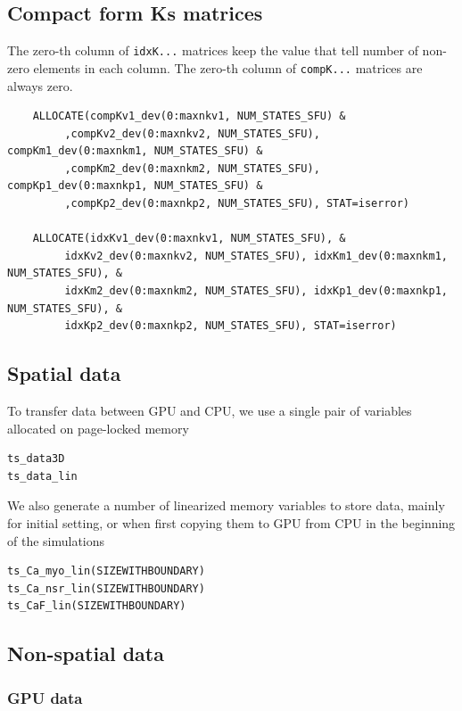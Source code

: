 \subsection{Compact form Ks matrices}
\label{sec:Ks_compact}

The zero-th column of \verb!idxK...! matrices keep the value that tell number of
non-zero elements in each column. The zero-th column of \verb!compK...! matrices
are always zero. 
\begin{verbatim}
    ALLOCATE(compKv1_dev(0:maxnkv1, NUM_STATES_SFU) &
         ,compKv2_dev(0:maxnkv2, NUM_STATES_SFU), compKm1_dev(0:maxnkm1, NUM_STATES_SFU) &
         ,compKm2_dev(0:maxnkm2, NUM_STATES_SFU), compKp1_dev(0:maxnkp1, NUM_STATES_SFU) &
         ,compKp2_dev(0:maxnkp2, NUM_STATES_SFU), STAT=iserror)

    ALLOCATE(idxKv1_dev(0:maxnkv1, NUM_STATES_SFU), &
         idxKv2_dev(0:maxnkv2, NUM_STATES_SFU), idxKm1_dev(0:maxnkm1, NUM_STATES_SFU), &
         idxKm2_dev(0:maxnkm2, NUM_STATES_SFU), idxKp1_dev(0:maxnkp1, NUM_STATES_SFU), &
         idxKp2_dev(0:maxnkp2, NUM_STATES_SFU), STAT=iserror)
\end{verbatim}


\subsection{Spatial data}
\label{sec:spatial_data}

To transfer data between GPU and CPU, we use a single pair of variables
allocated on page-locked memory
\begin{verbatim}
ts_data3D
ts_data_lin
\end{verbatim}

We also generate a number of linearized memory variables to store data, mainly
for initial setting, or when first copying them to GPU from CPU in the beginning
of the simulations
\begin{verbatim}
ts_Ca_myo_lin(SIZEWITHBOUNDARY)
ts_Ca_nsr_lin(SIZEWITHBOUNDARY)
ts_CaF_lin(SIZEWITHBOUNDARY)
\end{verbatim}



\subsection{Non-spatial data}
\label{sec:non-spatialdata}

\subsubsection{GPU data}
\label{sec:gpu-data}

